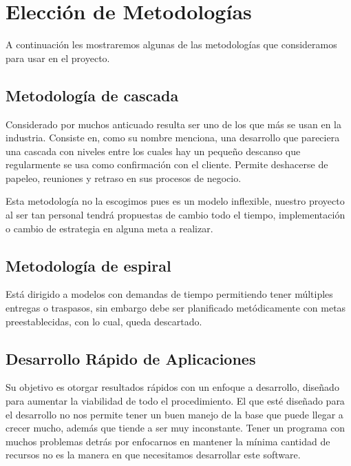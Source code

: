 \documentclass[12pt, fleqn]{report}                             %
\theoremstyle{break}                                            %
\begin{document}
    \section{Elección de Metodologías}
    
    	A continuación les mostraremos algunas de las metodologías que consideramos para
    	usar en el proyecto.
    	\subsection{Metodología de cascada}
    	
    	Considerado por muchos anticuado resulta ser uno de los que más se usan en la industria.
    	Consiste en, como su nombre menciona, una desarrollo que pareciera una cascada con niveles entre los cuales hay un pequeño descanso que regularmente se usa como confirmación con el cliente. Permite deshacerse de papeleo, reuniones y retraso en sus procesos de negocio.
    	
    	Esta metodología no la escogimos pues es un modelo inflexible, nuestro proyecto al ser tan personal tendrá propuestas de cambio todo el tiempo, implementación o cambio de estrategia en alguna meta a realizar.
    	
    	\subsection{Metodología de espiral}
        Está dirigido a modelos con demandas de tiempo permitiendo tener múltiples entregas o traspasos, sin embargo debe ser planificado metódicamente con metas preestablecidas, con lo cual, queda descartado.
        
        \subsection{Desarrollo Rápido de Aplicaciones}
        Su objetivo es otorgar resultados rápidos con un enfoque a desarrollo, diseñado para aumentar la viabilidad de todo el procedimiento. El que esté diseñado para el desarrollo no nos permite tener un buen manejo de la base que puede llegar a crecer mucho, además que tiende a ser muy inconstante.
        Tener un programa con muchos problemas detrás por enfocarnos en mantener la mínima cantidad de recursos no es la manera en que necesitamos desarrollar este software.
        
\end{document}
